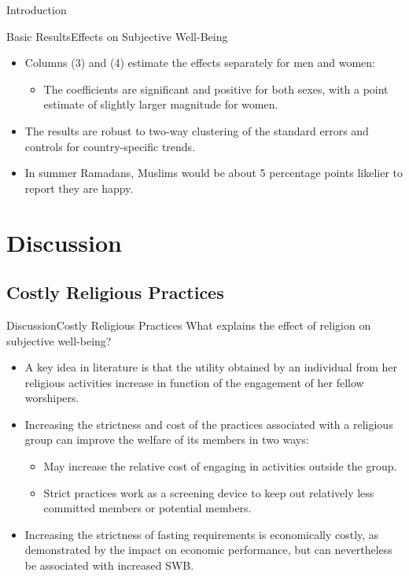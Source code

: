\documentclass[pdftex,12pt,xcolor=pdftex,table]{beamer}
\begin{document}
\begin{frame}{Introduction}
\begin{frame}{Basic Results}{Effects on Subjective Well-Being}
\begin{itemize}
\begin{itemize}
        \end{itemize}
        \item<3-> Columns (3) and (4) estimate the effects separately for men and women:
        \begin{itemize}
            \item<4-> The coefficients are significant and positive for both sexes, with a point estimate of slightly larger magnitude for women.
        \end{itemize}
        \item<5-> The results are robust to two-way clustering of the standard errors and controls for country-specific trends.
        \item<6-> In summer Ramadans, Muslims would be about 5 percentage points likelier to report they are happy.
    \end{itemize}
    \end{frame}    
 
\section{Discussion}
\subsection{Costly Religious Practices}
    \begin{frame}{Discussion}{Costly Religious Practices}
    What explains the effect of religion on subjective  well-being? 
    \begin{itemize}
        \item<2-> A key idea in literature is that the utility obtained by an individual from her religious activities increase in function of the engagement of her fellow worshipers.
        \item<3-> Increasing the strictness and cost of the practices associated with a religious group can improve the welfare of its members in two ways: 
        \begin{itemize}
            \item<4-> May increase the relative cost of engaging in activities outside the group.
            \item<5-> Strict practices work as a screening device to keep out relatively less committed members or potential members.
        \end{itemize}
        \item<6->  Increasing the strictness of fasting requirements is economically costly, as demonstrated by the impact on economic performance, but can nevertheless be associated with increased SWB.
    \end{itemize}


\end{frame}
\end{frame}
\end{document}
